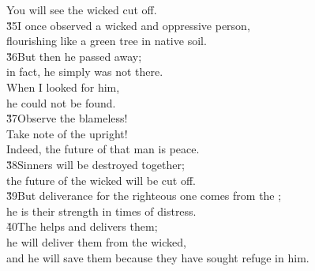 \begin{poetry}
\poeml You will see the wicked cut off. \\
\poeml \v{35}I once observed a wicked and oppressive person, \\
\poemll    flourishing like a green tree in native soil. \\
\poeml \v{36}But then he passed away; \\
\poemll    in fact, he simply was not there. \\
\poeml When I looked for him, \\
\poemll    he could not be found. \\
\poeml \v{37}Observe the blameless! \\
\poemll    Take note of the upright! \\
\poemlll       Indeed, the future of that man is peace. \\
\poeml \v{38}Sinners will be destroyed together; \\
\poemll    the future of the wicked will be cut off. \\
\poeml \v{39}But deliverance for the righteous one comes from the ; \\
\poemll    he is their strength in times of distress. \\
\poeml \v{40}The  helps and delivers them; \\
\poemll    he will deliver them from the wicked, \\
\poemlll       and he will save them because they have sought refuge in him.
\end{poetry}


